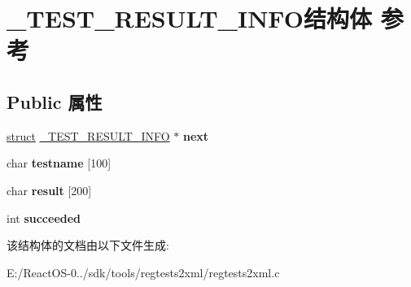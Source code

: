 \hypertarget{struct___t_e_s_t___r_e_s_u_l_t___i_n_f_o}{}\section{\+\_\+\+T\+E\+S\+T\+\_\+\+R\+E\+S\+U\+L\+T\+\_\+\+I\+N\+F\+O结构体 参考}
\label{struct___t_e_s_t___r_e_s_u_l_t___i_n_f_o}
\subsection*{Public 属性}
\begin{DoxyCompactItemize}
\item 
\mbox{\label{struct___t_e_s_t___r_e_s_u_l_t___i_n_f_o_a8f43bf871c0162d7d32fa4305cd1ecb2}} 
\hyperlink{interfacestruct}{struct} \hyperlink{struct___t_e_s_t___r_e_s_u_l_t___i_n_f_o}{\+\_\+\+T\+E\+S\+T\+\_\+\+R\+E\+S\+U\+L\+T\+\_\+\+I\+N\+FO} $\ast$ {\bfseries next}
\item 
\mbox{\label{struct___t_e_s_t___r_e_s_u_l_t___i_n_f_o_ae783c5163c221a532bc7adb713f5287c}} 
char {\bfseries testname} \mbox{[}100\mbox{]}
\item 
\mbox{\label{struct___t_e_s_t___r_e_s_u_l_t___i_n_f_o_a57572e5ba5bdece5c13c3323fa6e6ee2}} 
char {\bfseries result} \mbox{[}200\mbox{]}
\item 
\mbox{\label{struct___t_e_s_t___r_e_s_u_l_t___i_n_f_o_a0da75c14f87e76cd6395a3fccef9eb52}} 
int {\bfseries succeeded}
\end{DoxyCompactItemize}


该结构体的文档由以下文件生成\+:\begin{DoxyCompactItemize}
\item 
E\+:/\+React\+O\+S-\/0../sdk/tools/regtests2xml/regtests2xml.\+c\end{DoxyCompactItemize}
